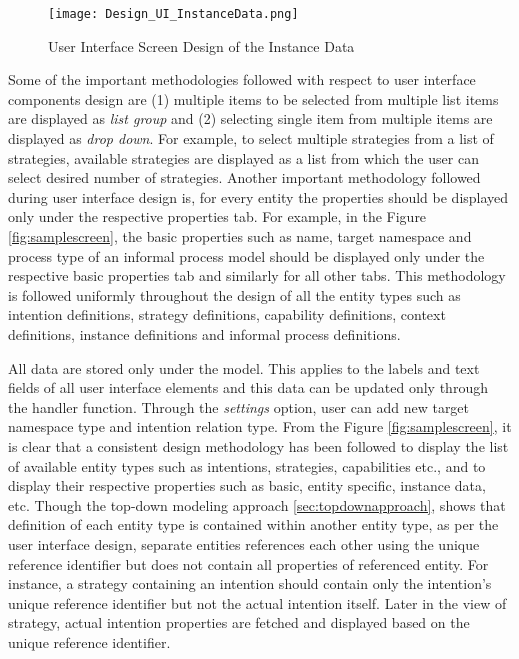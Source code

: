 \begin{figure} [H]
	\centering
	\texttt{[image: Design\_UI\_InstanceData.png]}
	\caption{User Interface Screen Design of the Instance Data}
	\label{fig:samplescreen_instance}
\end{figure}


Some of the important methodologies followed with respect to user interface components design are (1) multiple items to be selected from multiple list items are displayed as \textit{list group} and (2) selecting single item from multiple items are displayed as \textit{drop down}. For example, to select multiple strategies from a list of strategies, available strategies are displayed as a list from which the user can select desired number of strategies. Another important methodology followed during user interface design is, for every entity the properties should be displayed only under the respective properties tab. For example, in the Figure \ref{fig:samplescreen}, the basic properties such as name, target namespace and process type of an informal process model should be displayed only under the respective basic properties tab and similarly for all other tabs. This methodology is followed uniformly throughout the design of all the entity types such as intention definitions, strategy definitions, capability definitions, context definitions, instance definitions and informal process definitions. 

All data are stored only under the model. This applies to the labels and text fields of all user interface elements and this data can be updated only through the handler function. Through the \textit{settings} option, user can add new target namespace type and intention relation type. From the Figure \ref{fig:samplescreen}, it is clear that a consistent design methodology has been followed to display the list of available entity types such as intentions, strategies, capabilities etc., and to display their respective properties such as basic, entity specific, instance data, etc. Though the top-down modeling approach \ref{sec:topdownapproach}, shows that definition of each entity type is contained within another entity type, as per the user interface design, separate entities references each other using the unique reference identifier but does not contain all properties of referenced entity. For instance, a strategy containing an intention should contain only the intention's unique reference identifier but not the actual intention itself. Later in the view of strategy, actual intention properties are fetched and displayed based on the unique reference identifier. 


